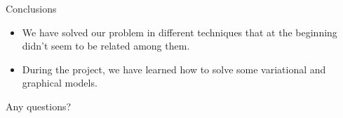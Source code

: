 \documentclass[11pt]{beamer}
\begin{document}
\begin{frame}{Conclusions}
\begin{itemize}
\item We have solved our problem in different techniques that at the beginning didn't seem to be related among them.
\item During the project, we have learned how to solve some variational and graphical models.

\end{itemize}
\end{frame}

\begin{frame}
\begin{block}{}
\centering
\Large Any questions?
\end{block}
\end{frame}
\end{document}
